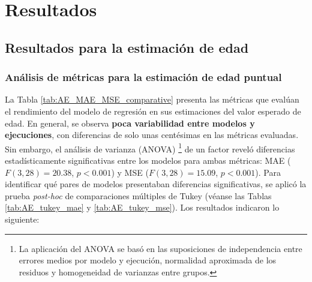 
\section{Resultados}


\subsection{Resultados para la estimación de edad}

\subsubsection{Análisis de métricas para la estimación de edad puntual}

La Tabla \ref{tab:AE_MAE_MSE_comparative} presenta las métricas que evalúan el rendimiento del modelo de regresión en sus estimaciones del valor esperado de edad. En general, se observa \textbf{poca variabilidad entre modelos y ejecuciones}, con diferencias de solo unas centésimas en las métricas evaluadas. Sin embargo, el análisis de varianza (ANOVA)%
\footnote{
    La aplicación del ANOVA se basó en las suposiciones de independencia entre errores medios por modelo y ejecución, normalidad aproximada de los residuos y homogeneidad de varianzas entre grupos.
} 
de un factor reveló diferencias estadísticamente significativas entre los modelos para ambas métricas: MAE ($F(3, 28) = 20.38$, $p < 0.001$) y MSE ($F(3, 28) = 15.09$, $p < 0.001$). Para identificar qué pares de modelos presentaban diferencias significativas, se aplicó la prueba \textit{post-hoc} de comparaciones múltiples de Tukey (véanse las Tablas \ref{tab:AE_tukey_mae} y \ref{tab:AE_tukey_mse}). Los resultados indicaron lo siguiente:


